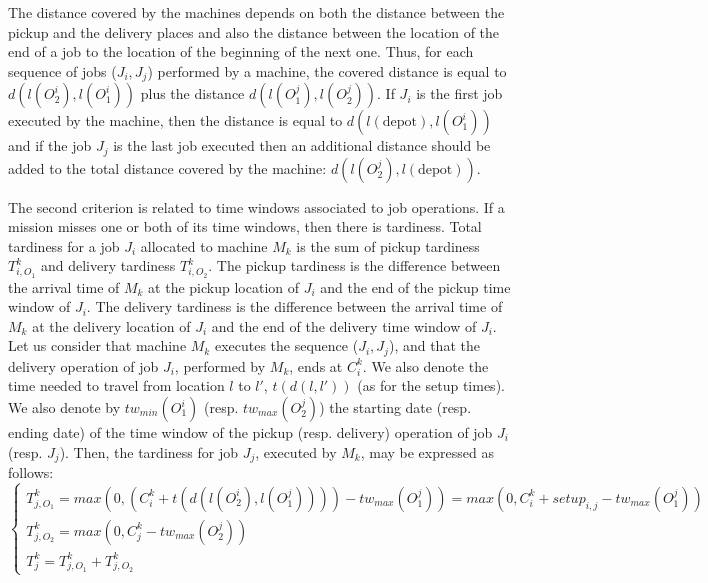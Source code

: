 \documentclass[a4paper,10pt]{article}
\begin{document}
The distance covered by the machines depends on both the distance between the pickup and the delivery places and also the distance between the location of the end of a job to the location of the beginning of the next one. Thus, for each sequence of jobs ($J_i,J_j$) performed by a machine, the covered distance is equal to $d(l(O^i_2), l(O^i_1))$ plus the distance $d(l(O^j_1), l(O^j_2))$. If $J_i$ is the first job executed by the machine, then the distance is equal to $d(l(\mbox{depot}),l(O^i_1))$ and if the job $J_j$ is the last job executed then an additional distance should be added to the total distance covered by the machine: $d(l(O^j_2),l(\mbox{depot}))$.

The second criterion is related to time windows associated to job operations. If a mission misses one or both of its time windows, then there is tardiness. Total tardiness for a job $J_i$ allocated to machine $M_k$ is the sum of pickup tardiness $T^k_{i,O_1}$ and delivery tardiness $T^k_{i,O_2}$. The pickup tardiness is the difference between the arrival time of $M_k$ at the pickup location of $J_i$ and the end of the pickup time window of $J_i$. The delivery tardiness is the difference between the arrival time of $M_k$ at the delivery location of $J_i$ and the end of the delivery time window of $J_i$. \\

Let us consider that machine $M_k$ executes the sequence ($J_i,J_j$), and that the delivery operation of job $J_i$, performed by $M_k$, ends at $C^k_i$. We also denote the time needed to travel from location $l$ to $l'$, $t(d(l,l'))$ (as for the setup times). We also denote by $tw_{min}(O^i_1)$ (resp. $tw_{max}(O^j_2)$) the starting date (resp. ending date) of the time window of the pickup (resp. delivery) operation of job $J_i$ (resp. $J_j$). Then, the tardiness for job $J_j$, executed by $M_k$, may be expressed as follows: 
\begin{equation*}
 \begin{cases}
    T^k_{j,O_1} = max(0, (C^k_i + t(d(l(O^i_2),l(O^j_1)))) - tw_{max}(O^j_1)) = max(0,C^k_i+setup_{i,j}-tw_{max}(O^j_1))\\
    T^k_{j,O_2} = max(0 ,C^k_j - tw_{max}(O^j_2))\\
    T^k_{j} = T^k_{j,O_1} + T^k_{j,O_2}
\end{cases}
\end{equation*}
\end{document}
